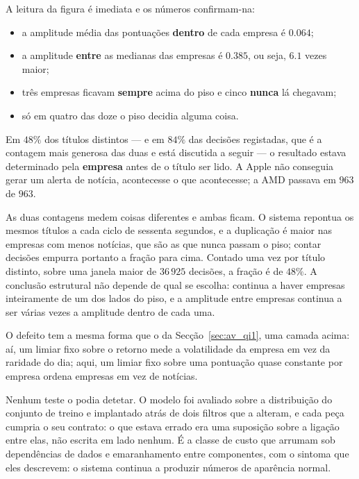 A leitura da figura é imediata e os números confirmam-na:

\begin{itemize}
  \item a amplitude média das pontuações \textbf{dentro} de cada empresa é $0.064$;
  \item a amplitude \textbf{entre} as medianas das empresas é $0.385$, ou seja, $6.1$ vezes maior;
  \item três empresas ficavam \textbf{sempre} acima do piso e cinco \textbf{nunca} lá chegavam;
  \item só em quatro das doze o piso decidia alguma coisa.
\end{itemize}

\begin{tcolorbox}[colback=orange!5, colframe=orange!45, boxrule=0.5pt, arc=2pt]
Em \textbf{$48\%$} dos títulos distintos --- e em $84\%$ das decisões registadas, que é a
contagem mais generosa das duas e está discutida a seguir --- o resultado estava determinado pela
\textbf{empresa} antes de o título ser lido. A Apple não conseguia gerar um alerta de notícia,
acontecesse o que acontecesse; a AMD passava em $963$ de $963$.
\end{tcolorbox}

As duas contagens medem coisas diferentes e ambas ficam. O sistema repontua os mesmos títulos a
cada ciclo de sessenta segundos, e a duplicação é maior nas empresas com menos notícias, que são
as que nunca passam o piso; contar decisões empurra portanto a fração para cima. Contado uma vez
por título distinto, sobre uma janela maior de $36\,925$ decisões, a fração é de $48\%$. A
conclusão estrutural não depende de qual se escolha: continua a haver empresas inteiramente de um
dos lados do piso, e a amplitude entre empresas continua a ser várias vezes a amplitude dentro de
cada uma.

O defeito tem a mesma forma que o da Secção~\ref{sec:av_qi1}, uma camada acima: aí, um limiar fixo
sobre o retorno mede a volatilidade da empresa em vez da raridade do dia; aqui, um limiar fixo
sobre uma pontuação quase constante por empresa ordena empresas em vez de notícias.

Nenhum teste o podia detetar. O modelo foi avaliado sobre a distribuição do conjunto de treino e
implantado atrás de dois filtros que a alteram, e cada peça cumpria o seu contrato: o que estava
errado era uma suposição sobre a ligação entre elas, não escrita em lado nenhum. É a classe de
custo que \textcite{sculley2015debt} arrumam sob dependências de dados e emaranhamento entre
componentes, com o sintoma que eles descrevem: o sistema continua a produzir números de aparência
normal.

